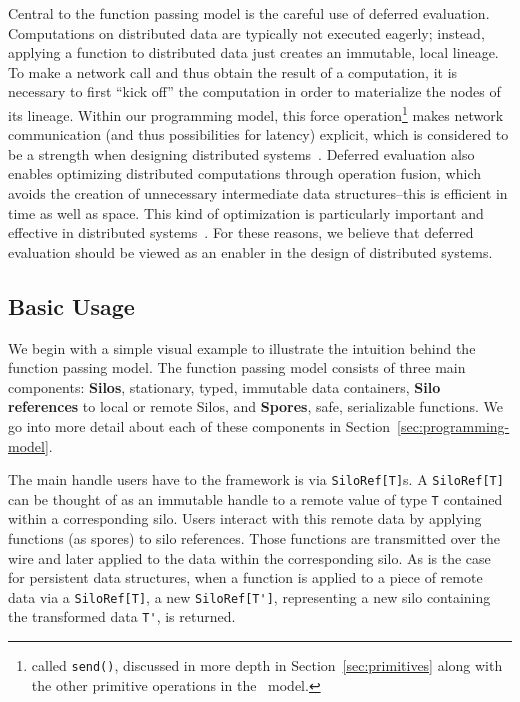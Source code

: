 \documentclass{jfp1}
\begin{document}
Central to the function passing model is the careful use of deferred evaluation.
Computations on distributed data are typically not executed eagerly; instead,
applying a function to distributed data just creates an immutable, local
lineage. To make a network call and thus obtain the result of a computation, it
is necessary to first ``kick off'' the computation in order to materialize the
nodes of its lineage. Within our programming model, this force operation\footnote{called
\texttt{send()}, discussed in more depth in Section~\ref{sec:primitives} along with 
the other primitive operations in the \FP~model.} makes 
network communication (and thus possibilities for latency)
explicit, which is considered to be a strength when designing distributed
systems~\cite{ANoteDistComp}. Deferred evaluation also enables optimizing
distributed computations through operation fusion, which avoids the creation of
unnecessary intermediate data structures--this is efficient in time as well as
space. This kind of optimization is particularly important and effective in
distributed systems~\cite{FlumeJava}. For these reasons, we believe that
deferred evaluation should be viewed as an enabler in the design of distributed
systems.

\subsection{Basic Usage}

We begin with a simple visual example to illustrate the intuition behind the 
function passing model. The function passing model consists of three main components: 
\textbf{Silos},
stationary, typed, immutable data containers, \textbf{Silo references} to local
or remote Silos, and \textbf{Spores}, safe, serializable functions. We go into 
more detail about each of these components in Section~\ref{sec:programming-model}.

The main handle users have to the framework is via
\verb|SiloRef[T]|s. A \verb|SiloRef[T]| can be thought of as an
immutable handle to a remote value of type \verb|T| contained within a
corresponding silo. Users interact with this remote data by applying
functions (as spores) to silo references. Those functions are
transmitted over the wire and later applied to the data within the
corresponding silo. As is the case for persistent data structures,
when a function is applied to a piece of remote data via a
\verb|SiloRef[T]|, a new \verb|SiloRef[T']|, representing a new silo
containing the transformed data \verb|T'|, is returned.
\end{document}
